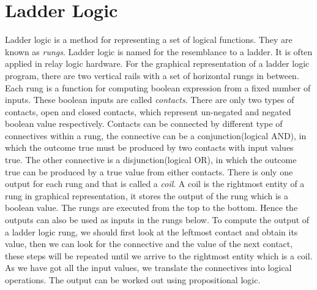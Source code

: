 \documentclass[a4paper,11pt]{report}
\begin{document}

%
%
\setcounter{page}{1}
\titlespacing*{\chapter}{0pt}{-30mm}{40pt}
\chapter{Ladder Logic}
Ladder logic is a method for representing a set of logical functions. They are known as \textit{rungs}. Ladder logic is named for the resemblance to a ladder. It is often applied in relay logic hardware. For the graphical representation of a ladder logic program, there are two vertical rails with a set of horizontal rungs in between. Each rung is a function for computing boolean expression from a fixed number of inputs. These boolean inputs are called \textit{contacts}. There are only two types of contacts, open and closed contacts, which represent un-negated and negated boolean value respectively. Contacts can be connected by different type of connectives within a rung, the connective can be a conjunction(logical AND), in which the outcome true must be produced by two contacts with input values true. The other connective is a disjunction(logical OR), in which the outcome true can be produced by a true value from either contacts. There is only one output for each rung and that is called a \textit{coil}. A coil is the rightmost entity of a rung in graphical representation, it stores the output of the rung which is a boolean value. The rungs are executed from the top to the bottom. Hence the outputs can also be used as inputs in the rungs below. 
\newline 
\newline 
To compute the output of a ladder logic rung, we should first look at the leftmost contact and obtain its value, then we can look for the connective and the value of the next contact, these steps will be repeated until we arrive to the rightmost entity which is a coil. As we have got all the input values, we translate the connectives into logical operations. The output can be worked out using propositional logic.
\end{document}
